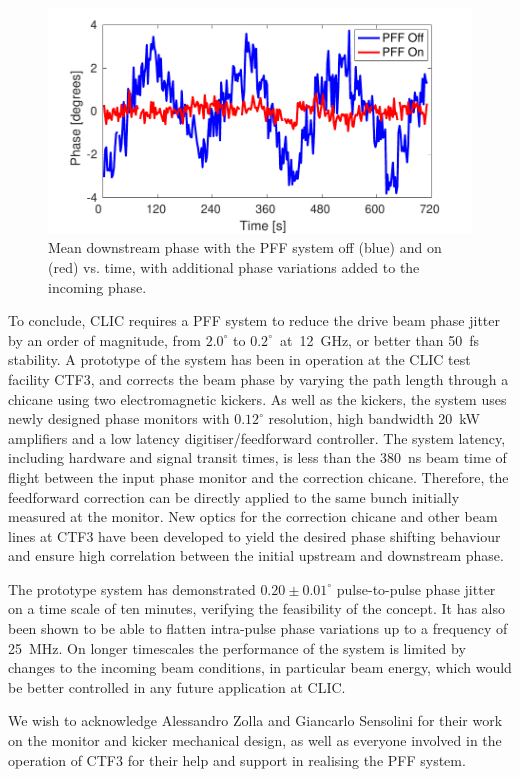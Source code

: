 \documentclass[%
 reprint,
superscriptaddress,
 amsmath,amssymb,
 prl,
]{revtex4-1}
\begin{document}
\begin{figure}
	\includegraphics[width=\columnwidth]{figs/wiggle}
	\caption{\label{fig:wiggle}Mean downstream phase with the PFF system off 
		(blue) and on (red) vs. time, with additional phase variations added to 
		the 
		incoming phase.}
\end{figure}

To conclude, CLIC requires a PFF system to reduce the drive beam phase jitter 
by an order of magnitude, from \(2.0^\circ\) to \(0.2^\circ\)~at~12~GHz, or 
better than 50~fs stability. A prototype of the system has been 
in operation at the CLIC test facility CTF3, and corrects the beam phase by 
varying the path length through a chicane using two electromagnetic kickers. 
As well as the kickers, the system uses newly designed phase monitors with 
\(0.12^\circ\) resolution, high bandwidth 20~kW amplifiers and a low latency 
digitiser/feedforward controller. The system latency, including hardware and 
signal transit times, is less than the 380~ns beam time of flight between the 
input phase monitor and the correction chicane. Therefore, the feedforward 
correction can be directly applied to the same bunch initially measured at the 
monitor. New optics for the correction chicane and other beam lines at CTF3 
have been 
developed to yield the desired phase shifting behaviour and ensure high 
correlation between the initial upstream and downstream phase.

The prototype system has demonstrated \(0.20\pm0.01^\circ\) pulse-to-pulse 
phase jitter on a time scale of ten minutes, verifying the feasibility of the 
concept. It has also been shown to be able 
to flatten intra-pulse phase variations up to a frequency of 25~MHz. On longer 
timescales the performance of the system is limited by changes to the incoming 
beam conditions, in particular beam energy, which would be better controlled in 
any future application at CLIC.

\begin{acknowledgments}
	We wish to acknowledge Alessandro Zolla and Giancarlo Sensolini
	for their work on the monitor and kicker mechanical design,
	as well as everyone involved in the operation of CTF3 for their 
	help and support in realising the PFF system.
\end{acknowledgments}

\end{document}
